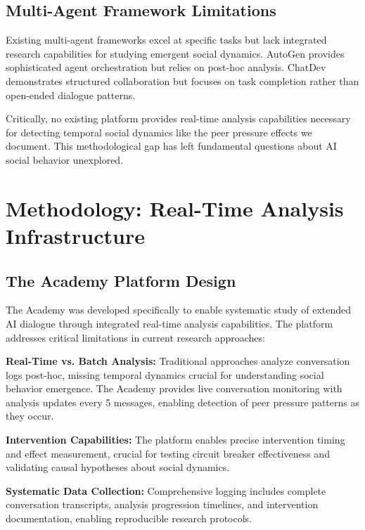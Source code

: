 \documentclass[11pt,letterpaper]{article}
\newcommand{\theacademy}{The Academy}
\begin{document}
\subsection{Multi-Agent Framework Limitations}

Existing multi-agent frameworks excel at specific tasks but lack integrated research capabilities for studying emergent social dynamics. AutoGen \citep{wu2023autogen} provides sophisticated agent orchestration but relies on post-hoc analysis. ChatDev \citep{qian2023chatdev} demonstrates structured collaboration but focuses on task completion rather than open-ended dialogue patterns.

Critically, no existing platform provides real-time analysis capabilities necessary for detecting temporal social dynamics like the peer pressure effects we document. This methodological gap has left fundamental questions about AI social behavior unexplored.

\section{Methodology: Real-Time Analysis Infrastructure}

\subsection{The Academy Platform Design}

\theacademy{} was developed specifically to enable systematic study of extended AI dialogue through integrated real-time analysis capabilities. The platform addresses critical limitations in current research approaches:

\textbf{Real-Time vs. Batch Analysis:} Traditional approaches analyze conversation logs post-hoc, missing temporal dynamics crucial for understanding social behavior emergence. \theacademy{} provides live conversation monitoring with analysis updates every 5 messages, enabling detection of peer pressure patterns as they occur.

\textbf{Intervention Capabilities:} The platform enables precise intervention timing and effect measurement, crucial for testing circuit breaker effectiveness and validating causal hypotheses about social dynamics.

\textbf{Systematic Data Collection:} Comprehensive logging includes complete conversation transcripts, analysis progression timelines, and intervention documentation, enabling reproducible research protocols.
\end{document}
